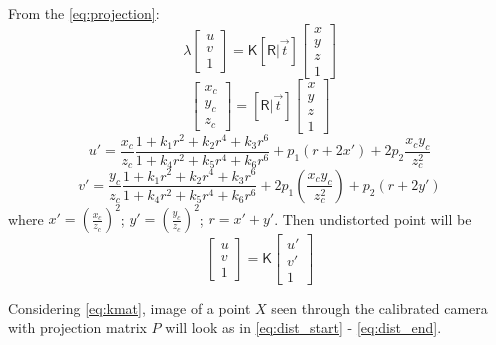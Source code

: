 From the \autoref{eq:projection}:
\begin{equation}
    \label{eq:dist_start}
    \lambda \begin{bmatrix} 
        u \\ v \\ 1 \end{bmatrix} = \pmb{\mathsf{K}} [\pmb{\mathsf{R}} | \vec{t}] \begin{bmatrix} x \\ y \\ z \\ 1
    \end{bmatrix}
\end{equation}
\begin{equation}
    \begin{bmatrix} x_c \\ y_c \\ z_c \end{bmatrix}
     = [\pmb{\mathsf{R}} | \vec{t}] \begin{bmatrix} x \\ y \\ z \\ 1
    \end{bmatrix}
\end{equation}
\begin{equation}
    u' = \frac{x_c}{z_c} \frac{1 + k_1r^2 + k_2r^4 + k_3r^6}{1 + k_4r^2 + k_5r^4 + k_6r^6} + p_1(r + 2x') + 2p_2\frac{x_c y_c}{z^2_c}
\end{equation}
\begin{equation}
    v' = \frac{y_c}{z_c} \frac{1 + k_1r^2 + k_2r^4 + k_3r^6}{1 + k_4r^2 + k_5r^4 + k_6r^6} + 2p_1(\frac{x_c y_c}{z_c^2}) + p_2(r + 2y')
\end{equation}
where $x' = (\frac{x_c}{z_c})^2$; $y' = (\frac{y_c}{z_c})^2$; $r = x' + y'$. Then undistorted point will be
\begin{equation}
    \label{eq:dist_end}
    \begin{bmatrix} u \\ v \\ 1 \end{bmatrix} = \pmb{\mathsf{K}} \begin{bmatrix} u' \\ v' \\ 1 \end{bmatrix}
\end{equation}

Considering \autoref{eq:kmat}, image of a point $X$ seen through the calibrated camera with projection matrix $P$ will look as in \autoref{eq:dist_start} - \autoref{eq:dist_end}.

